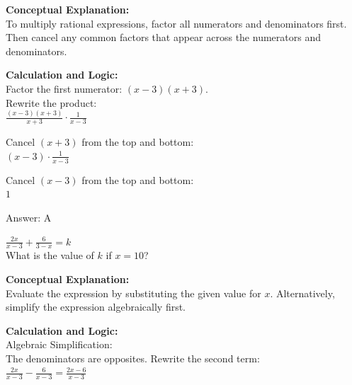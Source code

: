 \documentclass[11pt,paper=a4,answers]{exam}
\begin{document}
\begin{questions}
\begin{solution}
\textbf{Conceptual Explanation:} \\
To multiply rational expressions, factor all numerators and denominators first. Then cancel any common factors that appear across the numerators and denominators.

\vspace{20pt}

\textbf{Calculation and Logic:} \\
Factor the first numerator: $(x-3)(x+3)$. \\
Rewrite the product: \\
$\frac{(x-3)(x+3)}{x+3} \cdot \frac{1}{x-3}$

\vspace{10pt}

Cancel $(x+3)$ from the top and bottom: \\
$(x-3) \cdot \frac{1}{x-3}$

\vspace{10pt}

Cancel $(x-3)$ from the top and bottom: \\
$1$

\vspace{25pt}

Answer: \colorbox{yellow!100}{A}
\end{solution}

\vspace{40pt}

\question
$\frac{2x}{x-3} + \frac{6}{3-x} = k$ \\
What is the value of $k$ if $x = 10$?

\begin{solution}
\textbf{Conceptual Explanation:} \\
Evaluate the expression by substituting the given value for $x$. Alternatively, simplify the expression algebraically first.

\vspace{20pt}

\textbf{Calculation and Logic:} \\
Algebraic Simplification: \\
The denominators are opposites. Rewrite the second term: \\
$\frac{2x}{x-3} - \frac{6}{x-3} = \frac{2x-6}{x-3}$

\vspace{10pt}


\end{solution}
\end{questions}
\end{document}
